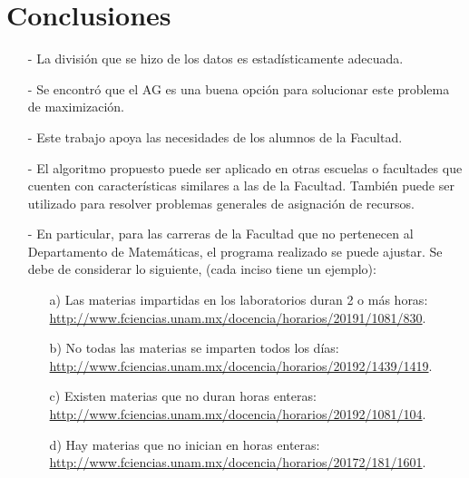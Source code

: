 \chapter{Conclusiones}

\begin{itemize}
\item[-] La división que se hizo de los datos es estadísticamente  adecuada.

\item[-] Se encontró que el AG es una buena opción para solucionar este problema de maximización.

\item[-] Este trabajo apoya las necesidades de los alumnos de la Facultad.

\item[-] El algoritmo propuesto puede ser aplicado en otras escuelas o facultades que cuenten con características similares a las de la Facultad. También puede ser utilizado para resolver problemas generales de asignación de recursos.

\item[-] En particular, para las carreras de la Facultad que no pertenecen al Departamento de Matemáticas, el programa realizado se puede ajustar. Se debe de considerar lo siguiente, (cada inciso tiene un ejemplo):

\begin{itemize}
\item[a)] Las materias impartidas en los laboratorios duran 2 o más horas: \url{http://www.fciencias.unam.mx/docencia/horarios/20191/1081/830}.

\item[b)] No todas las materias se imparten todos los días: \url{http://www.fciencias.unam.mx/docencia/horarios/20192/1439/1419}.

\item[c)] Existen materias que no duran horas enteras: \url{http://www.fciencias.unam.mx/docencia/horarios/20192/1081/104}.

\item[d)] Hay materias que no inician en horas enteras: \url{http://www.fciencias.unam.mx/docencia/horarios/20172/181/1601}.
\end{itemize}
\end{itemize}
